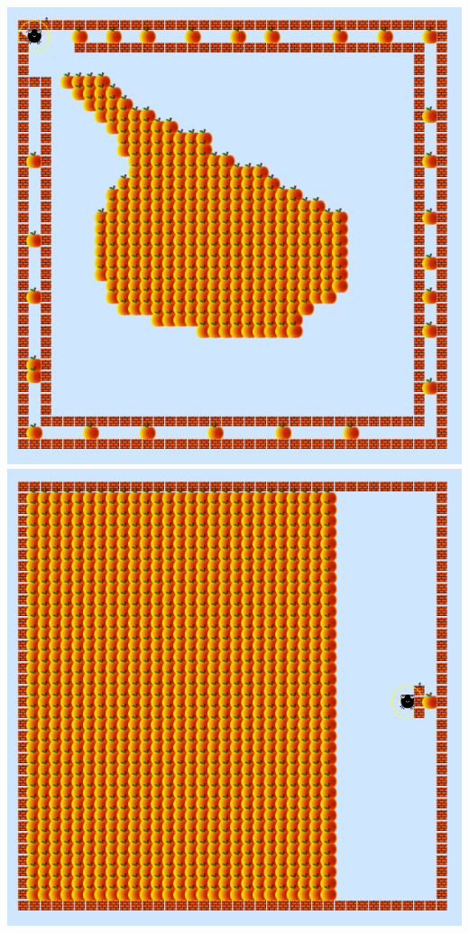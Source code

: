 \documentclass[12pt,a4paper]{report}
\begin{document}
\includegraphics[scale=0.4]{fly/2.png}
\includegraphics[scale=0.4]{fly/3.png}\\
\end{document}
